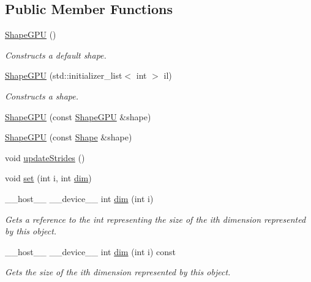 \subsection*{Public Member Functions}
\begin{DoxyCompactItemize}
\item 
\hyperlink{structmarian_1_1ShapeGPU_a0a8de43da6ef2eff572585f5780f8b61}{Shape\+G\+PU} ()
\begin{DoxyCompactList}\small\item\em Constructs a default shape. \end{DoxyCompactList}\item 
\hyperlink{structmarian_1_1ShapeGPU_a13529f654e08e8b5b5a74f6e66c22fdc}{Shape\+G\+PU} (std\+::initializer\+\_\+list$<$ int $>$ il)
\begin{DoxyCompactList}\small\item\em Constructs a shape. \end{DoxyCompactList}\item 
\hyperlink{structmarian_1_1ShapeGPU_a1d1f437e8b921acc0044d6b27fd9c0de}{Shape\+G\+PU} (const \hyperlink{structmarian_1_1ShapeGPU}{Shape\+G\+PU} \&shape)
\item 
\hyperlink{structmarian_1_1ShapeGPU_a0860255b1ddd7e4bbde8c9ebc60738ca}{Shape\+G\+PU} (const \hyperlink{structmarian_1_1Shape}{Shape} \&shape)
\item 
void \hyperlink{structmarian_1_1ShapeGPU_ac0dcb3abcea0f59dafd339cd49249547}{update\+Strides} ()
\item 
void \hyperlink{structmarian_1_1ShapeGPU_aabf629e515546d98185f54651936fa4e}{set} (int i, int \hyperlink{structmarian_1_1ShapeGPU_a5a960d13af52f0b02aa1ba0e6d29a734}{dim})
\item 
\+\_\+\+\_\+host\+\_\+\+\_\+ \+\_\+\+\_\+device\+\_\+\+\_\+ int \hyperlink{structmarian_1_1ShapeGPU_a5a960d13af52f0b02aa1ba0e6d29a734}{dim} (int i)
\begin{DoxyCompactList}\small\item\em Gets a reference to the int representing the size of the {\ttfamily i}th dimension represented by this object. \end{DoxyCompactList}\item 
\+\_\+\+\_\+host\+\_\+\+\_\+ \+\_\+\+\_\+device\+\_\+\+\_\+ int \hyperlink{structmarian_1_1ShapeGPU_a081cd10d19ea282349cd6258d1b438a1}{dim} (int i) const 
\begin{DoxyCompactList}\small\item\em Gets the size of the {\ttfamily i}th dimension represented by this object. \end{DoxyCompactList}\item 

\end{DoxyCompactItemize}
